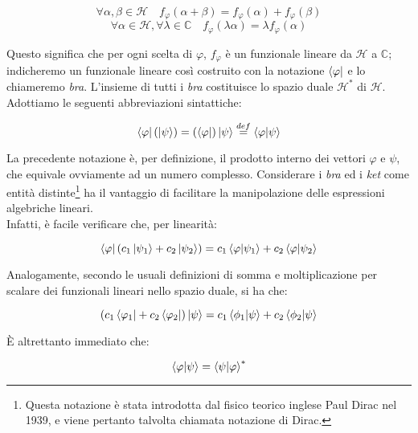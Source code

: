 	\begin{equation}
		\forall \alpha, \beta \in \mathcal{H} \quad f_{\varphi}(\alpha + \beta) = f_{\varphi}(\alpha) + f_{\varphi}(\beta)
	\end{equation}
	\begin{equation}
		\forall \alpha \in \mathcal{H},  \forall \lambda \in \mathbb{C} \quad f_{\varphi}(\lambda \alpha) = \lambda f_{\varphi}(\alpha)
	\end{equation}

Questo significa che per ogni scelta di $\varphi$, $f_{\varphi}$ è un funzionale lineare da $\mathcal{H}$ a $\mathbb{C}$; indicheremo un funzionale lineare così costruito con la notazione $\bra{\varphi}$ e lo chiameremo \textit{bra}. L'insieme di tutti i \textit{bra} costituisce lo spazio duale $\mathcal{H}^{*}$ di  $\mathcal{H}$. Adottiamo le seguenti abbreviazioni sintattiche:

	\begin{equation}
		\bra{\varphi}(\ket{\psi}) = (\bra{\varphi})\ket{\psi} \overset{def}{=} \braket{\varphi}{\psi}
	\end{equation}

La precedente notazione è, per definizione, il prodotto interno dei vettori $\varphi$ e $\psi$, che equivale ovviamente ad un numero complesso. Considerare i \textit{bra} ed i \textit{ket} come entità distinte\footnote{Questa notazione è stata introdotta dal fisico teorico inglese Paul Dirac nel 1939, e viene pertanto talvolta chiamata notazione di Dirac.} ha il vantaggio di facilitare la manipolazione delle espressioni algebriche lineari. \\
Infatti, è facile verificare che, per linearità:

	\begin{equation} \label{eq:linearityKets}
		\bra{\varphi}(c_1 \ket{\psi_1} + c_2 \ket{\psi_2}) = c_1 \braket{\varphi}{\psi_1} + c_2 \braket{\varphi}{\psi_2}
	\end{equation}

Analogamente, secondo le usuali definizioni di somma e moltiplicazione per scalare dei funzionali lineari nello spazio duale, si ha che:

	\begin{equation}
		(c_1 \bra{\varphi_1} + c_2 \bra{\varphi_2}) \ket{\psi} = c_1 \braket{\phi_1}{\psi} + c_2 \braket{\phi_2}{\psi}
	\end{equation}

È altrettanto immediato che:

	\begin{equation} \label{eq:conjugateBrakets}
		\braket{\varphi}{\psi} = \braket{\psi}{\varphi}^*
	\end{equation}

